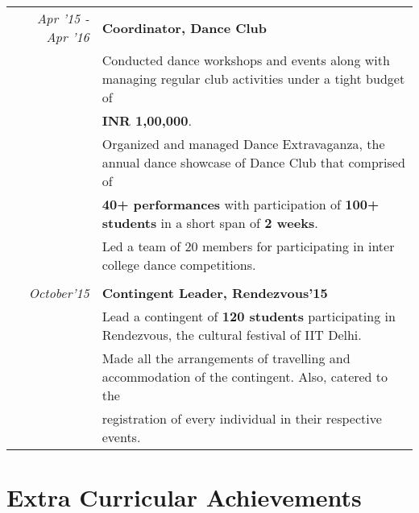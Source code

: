 \documentclass[a4paper]{norm-resume}
\begin{document}
	\begin{tabular}{r|p{16cm}}	
	
	\null \normalsize\emph{Apr '15 - Apr '16} & \textbf{Coordinator, Dance Club}\\
	& \small{Conducted dance workshops and events along with managing regular club activities under a tight budget of} \\
	& \small{\textbf{INR 1,00,000}.}\\
	& \small{Organized and managed Dance Extravaganza, the annual dance showcase of Dance Club that comprised of} \\
	& \small{\textbf{40+ performances} with participation of \textbf{100+ students} in a short span of \textbf{2 weeks}.}\\
	& \small{Led a team of 20 members for participating in inter college dance competitions.}\\

	\multicolumn{2}{c}{} \\
	\normalsize\emph{October'15} & \textbf{Contingent Leader, Rendezvous'15}\\
	& \small{Lead a contingent of \textbf{120 students} participating in Rendezvous, the cultural festival of IIT Delhi.}\\
	& \small{Made all the arrangements of travelling and accommodation of the contingent. Also, catered to the } \\
	& \small{registration of every individual in their respective events.} \\
	\end{tabular}

\vspace{1mm}	%

\section{Extra Curricular Achievements}

\vspace{2mm} %
		
\end{document}
